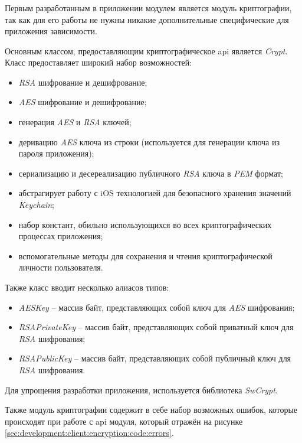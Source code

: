 \subsubsection{}
\label{sec:development:client:encryption}

Первым разработанным в приложении модулем является модуль криптографии, так как для его работы не нужны никакие дополнительные специфические для приложения зависимости.

Основным классом, предоставляющим криптографическое \gls{api} является \textit{Crypt}. Класс предоставляет широкий набор возможностей:

\begin{itemize}
	\item \textit{RSA} шифрование и дешифрование;
	\item \textit{AES} шифрование и дешифрование;
	\item генерация \textit{AES} и \textit{RSA} ключей;
	\item деривацию \textit{AES} ключа из строки (используется для генерации ключа из пароля приложения);
	\item сериализацию и десереализацию публичного \textit{RSA} ключа в \textit{PEM} формат;
	\item абстрагирует работу с iOS технологией для безопасного хранения значений \textit{Keychain};
	\item набор констант, обильно использующихся во всех криптографических процессах приложения;
	\item вспомогательные методы для сохранения и чтения криптографической личности пользователя.
\end{itemize}

Также класс вводит несколько алиасов типов:
\begin{itemize}
	\item \textit{AESKey} -- массив байт, представляющих собой ключ для \textit{AES} шифрования;
	\item \textit{RSAPrivateKey} -- массив байт, представляющих собой приватный ключ для \textit{RSA} шифрования;
	\item \textit{RSAPublicKey} -- массив байт, представляющих собой публичный ключ для \textit{RSA} шифрования.
\end{itemize}

Для упрощения разработки приложения, используется библиотека \textit{SwCrypt}.

Также модуль криптографии содержит в себе набор возможных ошибок, которые происходят при работе с \gls{api} модуля, который отражён на рисунке \ref{sec:development:client:encryption:code:errors}.

